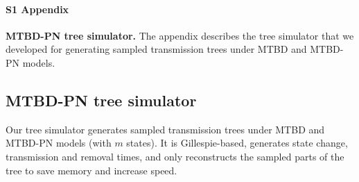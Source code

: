 \documentclass[10pt,letterpaper]{article}
\begin{document}
%
%
%
%
%
%
%

\paragraph*{S1 Appendix}
\label{S1_Appendix}

{\bf MTBD-PN tree simulator.} The appendix describes the tree simulator that we developed for generating sampled transmission trees under MTBD and MTBD-PN models.

\subsection*{MTBD-PN tree simulator}

Our tree simulator generates sampled transmission trees under MTBD and MTBD-PN models (with $m$ states). It is Gillespie-based, generates state change, transmission and removal times, and only reconstructs the sampled parts of the tree to save memory and increase speed.  
\end{document}

